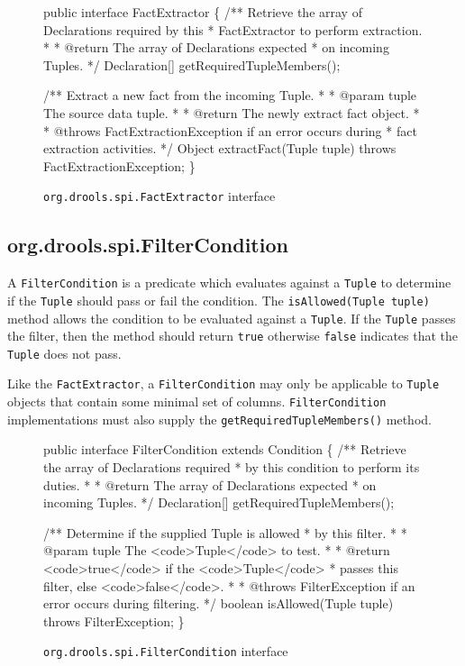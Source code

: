 \begin{figure}
\begin{codelisting}
public interface FactExtractor
\{
    /** Retrieve the array of Declarations required by this 
     *  FactExtractor to perform extraction.
     *
     *  @return The array of Declarations expected 
     *          on incoming Tuples.
     */
    Declaration[] getRequiredTupleMembers();

    /** Extract a new fact from the incoming Tuple.
     *
     *  @param tuple The source data tuple.
     *
     *  @return The newly extract fact object.
     *
     *  @throws FactExtractionException if an error occurs during
     *          fact extraction activities.
     */
    Object extractFact(Tuple tuple) throws FactExtractionException;
\}
\end{codelisting}
\label{code.FactExtractor}
\caption{\texttt{org.drools.spi.FactExtractor} interface}
\end{figure}

\subsection{org.drools.spi.FilterCondition}

A \verb|FilterCondition| is a predicate which evaluates against
a \verb|Tuple| to determine if the \verb|Tuple| should pass or
fail the condition. The \verb|isAllowed(Tuple tuple)| method
allows the condition to be evaluated against a \verb|Tuple|.
If the \verb|Tuple| passes the filter, then the method should
return \verb|true| otherwise \verb|false| indicates that
the \verb|Tuple| does not pass.

Like the \verb|FactExtractor|, a
\verb|FilterCondition| may only be applicable to \verb|Tuple|
objects that contain some minimal set of columns.  
\verb|FilterCondition| implementations must also supply
the \verb|getRequiredTupleMembers()| method.

\begin{figure}
\begin{codelisting}
public interface FilterCondition extends Condition
\{
    /** Retrieve the array of Declarations required
     *  by this condition to perform its duties.
     *
     *  @return The array of Declarations expected
     *          on incoming Tuples.
     */
    Declaration[] getRequiredTupleMembers();

    /** Determine if the supplied Tuple is allowed
     *  by this filter.
     *
     *  @param tuple The <code>Tuple</code> to test.
     *
     *  @return <code>true</code> if the <code>Tuple</code>
     *          passes this filter, else <code>false</code>.
     *
     *  @throws FilterException if an error occurs during filtering.
     */
    boolean isAllowed(Tuple tuple) throws FilterException;
\}
\end{codelisting}
\label{code.FilterCondition}
\caption{\texttt{org.drools.spi.FilterCondition} interface}
\end{figure}

